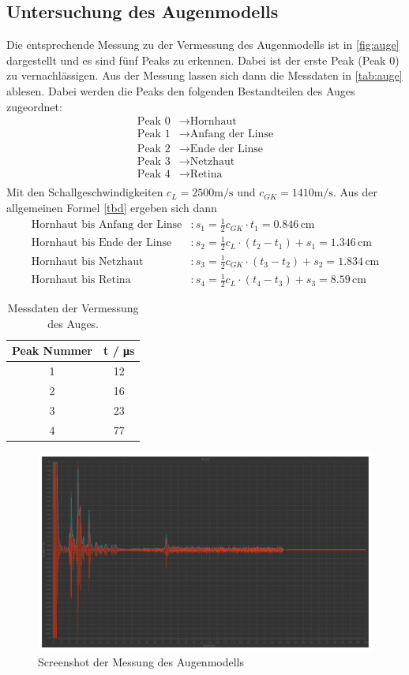\subsection{Untersuchung des Augenmodells}

Die entsprechende Messung zu der Vermessung des Augenmodells ist in \autoref{fig:auge} dargestellt
und es sind fünf Peaks zu erkennen. Dabei ist der erste Peak (Peak 0) zu vernachlässigen.
Aus der Messung lassen sich dann die Messdaten in \autoref{tab:auge} ablesen.
Dabei werden die Peaks den folgenden Bestandteilen des Auges zugeordnet:
\begin{align*}
  \text{Peak 0} &\to \text{Hornhaut} \\
  \text{Peak 1} &\to \text{Anfang der Linse} \\
  \text{Peak 2} &\to \text{Ende der Linse} \\
  \text{Peak 3} &\to \text{Netzhaut} \\
  \text{Peak 4} &\to \text{Retina} \\  
\end{align*}
Mit den Schallgeschwindigkeiten $c_L = 2500 \unit{\meter / \second}$ und $c_{GK} = 1410 \unit{\meter / \second}$.
Aus der allgemeinen Formel \ref{tbd} ergeben sich dann
\begin{align*}
  \text{Hornhaut bis Anfang der Linse}&: s_1 = \frac{1}{2} c_{GK} \cdot t_1 = 0.846 \, \unit{\centi\meter} \\
  \text{Hornhaut bis Ende der Linse}&: s_2 = \frac{1}{2} c_L \cdot (t_2 - t_1) + s_1 = 1.346 \, \unit{\centi\meter} \\
  \text{Hornhaut bis Netzhaut}&: s_3 = \frac{1}{2} c_{GK} \cdot (t_3 - t_2) + s_2 = 1.834 \, \unit{\centi\meter} \\
  \text{Hornhaut bis Retina}&: s_4 = \frac{1}{2} c_{L} \cdot (t_4 - t_3) + s_3 = 8.59 \, \unit{\centi\meter} 
\end{align*}


\begin{table}
  \centering
  \caption{Messdaten der Vermessung des Auges.}
  \label{tab:auge}
  \begin{tabular}{c c}
      \toprule
      Peak Nummer & t / \unit{\micro\second}\\ 
      \midrule
      1 & 12\\
      2 & 16\\
      3 & 23\\
      4 & 77\\
      \bottomrule
  \end{tabular}
\end{table}

\begin{figure}
  \centering
  \includegraphics[width = 0.8\linewidth]{pictures/auge/Messung1Auge.pdf}
  \caption{Screenshot der Messung des Augenmodells}
  \label{fig:auge}
\end{figure}